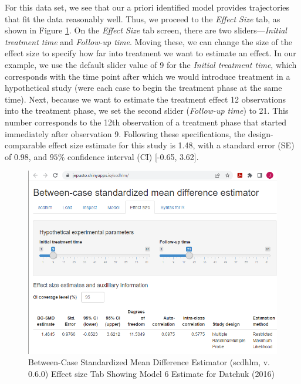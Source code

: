 \documentclass[
]{book}
\begin{document}
For this data set, we see that our a priori identified model provides trajectories that fit the data reasonably well. Thus, we proceed to the \emph{Effect Size} tab, as shown in Figure \ref{fig:Datchuk-2016-ES}. On the \emph{Effect Size} tab screen, there are two sliders---\emph{Initial treatment time} and \emph{Follow-up time}. Moving these, we can change the size of the effect size to specify how far into treatment we want to estimate an effect. In our example, we use the default slider value of 9 for the \emph{Initial treatment time}, which corresponds with the time point after which we would introduce treatment in a hypothetical study (were each case to begin the treatment phase at the same time). Next, because we want to estimate the treatment effect 12 observations into the treatment phase, we set the second slider (\emph{Follow-up time}) to 21. This number corresponds to the 12th observation of a treatment phase that started immediately after observation 9. Following these specifications, the design-comparable effect size estimate for this study is 1.48, with a standard error (SE) of 0.98, and \(95\%\) confidence interval (CI) {[}-0.65, 3.62{]}.

\begin{figure}
\includegraphics[width=0.75\linewidth]{images/app.ES.model6_Datchuk2016} \caption{Between-Case Standardized Mean Difference Estimator (scdhlm, v. 0.6.0) Effect size Tab Showing Model 6 Estimate for Datchuk (2016)}\label{fig:Datchuk-2016-ES}
\end{figure}
\end{document}
